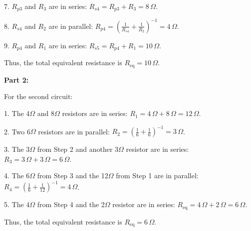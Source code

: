 \documentclass{article}
\begin{document}
7. \( R_{p3} \) and \( R_3 \) are in series:  
   \( R_{s4} = R_{p3} + R_3 = 8 \, \Omega \).

8. \( R_{s4} \) and \( R_2 \) are in parallel:  
   \( R_{p4} = \left( \frac{1}{R_{s4}} + \frac{1}{R_2} \right)^{-1} = 4 \, \Omega \).

9. \( R_{p4} \) and \( R_1 \) are in series:  
   \( R_{s5} = R_{p4} + R_1 = 10 \, \Omega \).

Thus, the total equivalent resistance is \( R_{\text{eq}} = 10 \, \Omega \).

\bigskip

\textbf{Part 2:}

For the second circuit:

1. The 4$\Omega$ and 8$\Omega$ resistors are in series:  
   \( R_1 = 4 \, \Omega + 8 \, \Omega = 12 \, \Omega \).

2. Two 6$\Omega$ resistors are in parallel:  
   \( R_2 = \left( \frac{1}{6} + \frac{1}{6} \right)^{-1} = 3 \, \Omega \).

3. The 3$\Omega$ from Step 2 and another 3$\Omega$ resistor are in series:  
   \( R_3 = 3 \, \Omega + 3 \, \Omega = 6 \, \Omega \).

4. The 6$\Omega$ from Step 3 and the 12$\Omega$ from Step 1 are in parallel:  
   \( R_4 = \left( \frac{1}{6} + \frac{1}{12} \right)^{-1} = 4 \, \Omega \).

5. The 4$\Omega$ from Step 4 and the 2$\Omega$ resistor are in series:  
   \( R_{\text{eq}} = 4 \, \Omega + 2 \, \Omega = 6 \, \Omega \).

Thus, the total equivalent resistance is \( R_{\text{eq}} = 6 \, \Omega \).
\bigskip
\end{document}
